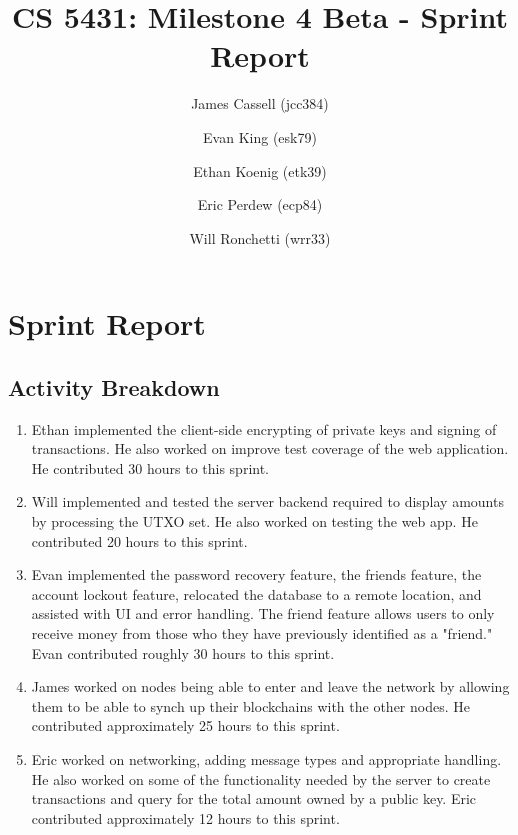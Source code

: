 \documentclass[a4paper,12pt]{article}
\title{CS 5431: Milestone 4 Beta - Sprint Report}
\author{
James Cassell (jcc384)
\and
Evan King (esk79)
\and
Ethan Koenig (etk39)
\and
Eric Perdew (ecp84)
\and
Will Ronchetti (wrr33)
}
\begin{document}
\maketitle

\section{Sprint Report}

\subsection{Activity Breakdown}

\begin{enumerate}
\item Ethan implemented the client-side encrypting of private keys and signing of transactions. He also worked on improve test coverage of the web application. He contributed 30 hours to this sprint.
\item Will implemented and tested the server backend required to display amounts by processing the UTXO set. He also worked on testing the web app. He contributed 20 hours to this sprint. 
\item Evan implemented the password recovery feature, the friends feature, the account lockout feature, relocated the database to a remote location, and assisted with UI and error handling. The friend feature allows users to only receive money from those who they have previously identified as a "friend." Evan contributed roughly 30 hours to this sprint.
\item James worked on nodes being able to enter and leave the network by allowing them to be able to synch up their blockchains with the other nodes.
He contributed approximately 25 hours to this sprint.
\item Eric worked on networking, adding message types and appropriate handling.
He also worked on some of the functionality needed by the server to create transactions and query for the total amount owned by a public key.
Eric contributed approximately 12 hours to this sprint.
\end{enumerate}
\end{document}
